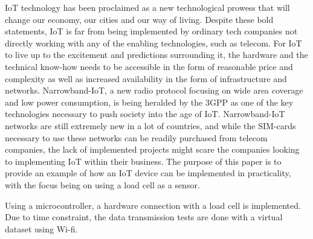 IoT technology has been proclaimed as a new technological prowess that will change our economy, our cities and our way of living. Despite these bold statements, IoT is far from being implemented by
ordinary tech companies not directly working with any of the enabling technologies, such as telecom. For IoT to live up to the excitement and predictions surrounding it, the hardware and the technical know-how needs to be accessible in the form of reasonable price and complexity as well as increased availability in the form of infrastructure and networks. 
Narrowband-IoT, a new radio protocol focusing on wide area coverage and low power consumption, is being heralded by the 3GPP as one of the key technologies necessary to push society into the age of IoT. Narrowband-IoT networks are still extremely new in a lot of countries, and while the SIM-cards necessary to use these networks can be readily purchased from telecom companies, the lack of implemented projects might scare the companies looking to implementing IoT within their business. The purpose of this paper is to provide an example of how an IoT device can be implemented in practicality, with the focus being on using a load cell as a sensor. 

Using a microcontroller, a hardware connection with a load cell is implemented. Due to time constraint, the data transmission tests are done with a virtual dataset using Wi-fi. 
